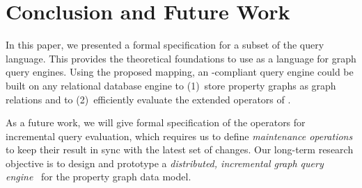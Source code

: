 \section{Conclusion and Future Work}
\label{sec:conclusion}

In this paper, we presented a formal specification for a subset of the \opencypher query language. This provides the theoretical foundations to use \opencypher as a language for graph query engines. Using the proposed mapping, an \opencypher-compliant query engine could be built on any relational database engine to (1)~store property graphs as graph relations and to (2)~efficiently evaluate the extended operators of \rga.

As a future work, we will give formal specification of the operators for incremental query evaluation, which requires us to define \emph{maintenance operations} to keep their result in sync with the latest set of changes. Our long-term research objective is to design and prototype a \emph{distributed, incremental graph query engine}~\cite{DBLP:conf/models/SzarnyasIRHBV14} for the property graph data model.
